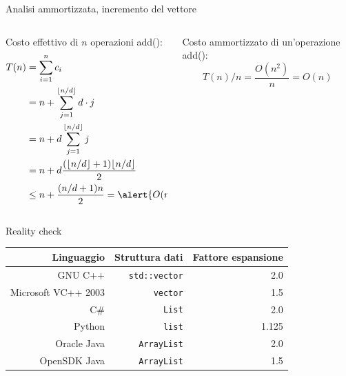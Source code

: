 \begin{frame}{Analisi ammortizzata, incremento del vettore}
	
\vspace{-9pt}
\begin{columns}[T]
\begin{column}{0.57\textwidth}
\alert{Costo effettivo di $n$ operazioni \textsf{add}()}:
\begin{align*}
  T(n) &= \sum_{i=1}^{n} c_i \\
    &= n + \sum_{j=1}^{\lfloor n/d \rfloor} d \cdot j \\
    &= n + d\sum_{j=1}^{\lfloor n/d \rfloor} j \\
    &= n + d \frac{(\lfloor n/d \rfloor+1)\lfloor n/d \rfloor}{2} \\
    &\leq n + \frac{(n/d+1)n}{2} =  \alert{O(n^2)}
\end{align*}
\end{column}
\begin{column}{0.43\textwidth}
\alert{Costo ammortizzato di un'operazione \textsf{add}()}: \[ T(n)/n = \frac{O(n^2)}{n} = O(n)\]
\end{column}
\end{columns}

\end{frame}

\begin{frame}{Reality check}

\begin{center}
\begin{tabular}{|r|r|r|}
\hline
\textbf{Linguaggio} & \textbf{Struttura dati} & \textbf{Fattore espansione} \\
\hline
GNU C++ & \texttt{std::vector} & 2.0 \\
\hline
Microsoft VC++ 2003 & \texttt{vector} & 1.5 \\
\hline
C\# & \texttt{List} & 2.0 \\
\hline
Python & \texttt{list} & 1.125 \\
\hline
Oracle Java & \texttt{ArrayList} & 2.0 \\
\hline
OpenSDK Java & \texttt{ArrayList} & 1.5 \\
\hline
\end{tabular}
\end{center}

\end{frame}


